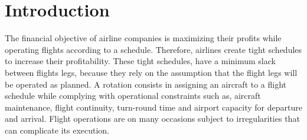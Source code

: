 \documentclass[ijoo,nonblindrev]{informs-ijoo}
\begin{document}
%


\section{Introduction}

The financial objective of airline companies is maximizing their profits while operating flights according to a schedule. Therefore, airlines create tight schedules to increase their profitability. These tight schedules, have a minimum slack between flights legs, because they rely on the assumption that the flight legs will be operated as planned. A rotation consists in assigning an aircraft to a flight schedule while complying with operational constraints such as, aircraft maintenance, flight continuity, turn-round time and airport capacity for departure and arrival. Flight operations are on many occasions subject to irregularities that can complicate its execution. 
\end{document}
